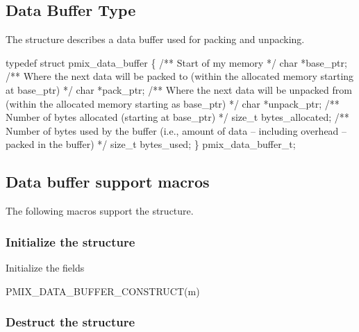 \subsection{Data Buffer Type}

The  structure describes a data buffer used for packing and unpacking.

\cspecificstart
\begin{codepar}
typedef struct pmix_data_buffer \{
    /** Start of my memory */
    char *base_ptr;
    /** Where the next data will be packed to
        (within the allocated memory starting
        at base_ptr) */
    char *pack_ptr;
    /** Where the next data will be unpacked
        from (within the allocated memory
        starting as base_ptr) */
    char *unpack_ptr;
    /** Number of bytes allocated (starting
        at base_ptr) */
    size_t bytes_allocated;
    /** Number of bytes used by the buffer
        (i.e., amount of data -- including
        overhead -- packed in the buffer) */
    size_t bytes_used;
\} pmix_data_buffer_t;
\end{codepar}
\cspecificend

\subsection{Data buffer support macros}
The following macros support the  structure.

\subsubsection{Initialize the  structure}

Initialize the  fields

\cspecificstart
\begin{codepar}
PMIX_DATA_BUFFER_CONSTRUCT(m)
\end{codepar}
\cspecificend

\begin{arglist}
\end{arglist}

\subsubsection{Destruct the  structure}

